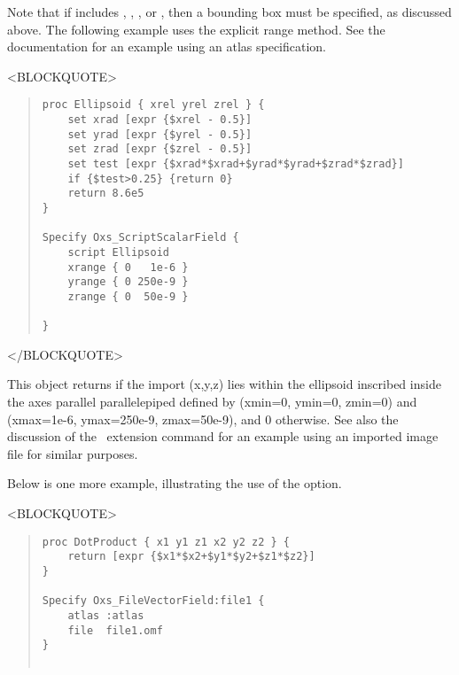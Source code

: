 \begin{description}
   Note that if  includes , ,
   , or , then a bounding box must be specified, as
   discussed above.  The following example uses the explicit range
   method.  See the 
   documentation
   for an example using an atlas specification.
\begin{rawhtml}<BLOCKQUOTE>\end{rawhtml}
\begin{quote}
\begin{verbatim}
proc Ellipsoid { xrel yrel zrel } {
    set xrad [expr {$xrel - 0.5}]
    set yrad [expr {$yrel - 0.5}]
    set zrad [expr {$zrel - 0.5}]
    set test [expr {$xrad*$xrad+$yrad*$yrad+$zrad*$zrad}]
    if {$test>0.25} {return 0}
    return 8.6e5
}

Specify Oxs_ScriptScalarField {
    script Ellipsoid
    xrange { 0   1e-6 }
    yrange { 0 250e-9 }
    zrange { 0  50e-9 }

}\end{verbatim}
\end{quote}
\begin{rawhtml}</BLOCKQUOTE>\end{rawhtml}
   This  object returns  if the import (x,y,z) lies within the ellipsoid
   inscribed inside the axes parallel parallelepiped defined by (xmin=0,
   ymin=0, zmin=0) and (xmax=1e-6, ymax=250e-9, zmax=50e-9), and 0
   otherwise.
   See also the discussion of the
    \MIF\ extension command
    for an example using
   an imported image file for similar purposes.

   Below is one more example, illustrating the use of the
    option.
\begin{rawhtml}<BLOCKQUOTE>\end{rawhtml}
\begin{quote}
\begin{verbatim}
proc DotProduct { x1 y1 z1 x2 y2 z2 } {
    return [expr {$x1*$x2+$y1*$y2+$z1*$z2}]
}

Specify Oxs_FileVectorField:file1 {
    atlas :atlas
    file  file1.omf
}


\end{verbatim}
\end{quote}
\end{description}
